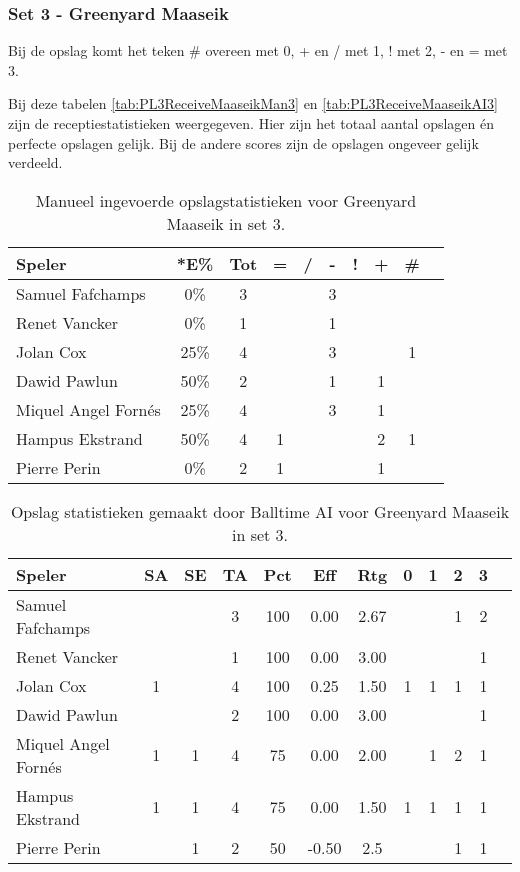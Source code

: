 \subsubsection{Set 3 - Greenyard Maaseik}
\label{sec:PL3_Greenyard3}
Bij de opslag komt het teken \# overeen met 0, + en / met 1, ! met 2, - en = met 3.

Bij deze tabelen \ref{tab:PL3ReceiveMaaseikMan3} en \ref{tab:PL3ReceiveMaaseikAI3} zijn de receptiestatistieken weergegeven. Hier zijn het totaal aantal opslagen én perfecte opslagen gelijk. Bij de andere scores zijn de opslagen ongeveer gelijk verdeeld.

\begin{table}[ht!]
    \centering
    \scriptsize
    \begin{tabular}{|l|c|c|c|c|c|c|c|c|c|} \hline
        \textbf{Speler} & *E\% & Tot & = & / & - & ! & + & \#\\ \hline
        Samuel Fafchamps & 0\% & 3 &  &  & 3 &  &  &  \\ 
        Renet Vancker & 0\% & 1 &  &  & 1 &  &  & \\ 
        Jolan Cox & 25\% & 4 &  &  & 3 &  &  & 1 \\ 
        Dawid Pawlun & 50\% & 2 &  &  & 1 &  & 1 &  \\ 
        Miquel Angel Fornés & 25\% & 4 &  &  & 3 &  & 1 &  \\ 
        Hampus Ekstrand & 50\% & 4 & 1 &  &  &  & 2 & 1 \\ 
        Pierre Perin & 0\% & 2 & 1 &  &  &  & 1 &  \\ \hline
    \end{tabular}
    \caption[Manueel ingevoerde opslagstatistieken voor Greenyard Maaseik in set 3]{\label{tab:PL3ServeMaaseikMan3}Manueel ingevoerde opslagstatistieken voor Greenyard Maaseik in set 3.}
\end{table}

\begin{table}[ht!]
  \centering
  \scriptsize
  \begin{tabular}{|l|c|c|c|c|c|c|c|c|c|c|c|} \hline
    \textbf{Speler} & SA & SE & TA & Pct & Eff & Rtg & 0 & 1 & 2 & 3 \\ \hline
    Samuel Fafchamps &  &  & 3 & 100 & 0.00 & 2.67 &   &  & 1 & 2  \\
    Renet Vancker &  &  & 1 & 100 & 0.00 & 3.00 &  &  &  & 1 \\
    Jolan Cox & 1 &  & 4 & 100 & 0.25 & 1.50 & 1 & 1 & 1 & 1 \\
    Dawid Pawlun &  &  & 2 & 100 & 0.00 & 3.00 &   &   & & 1 \\
    Miquel Angel Fornés & 1 & 1 & 4 & 75 & 0.00 & 2.00 &   & 1 & 2 & 1 \\
    Hampus Ekstrand & 1 & 1 & 4 & 75 & 0.00 & 1.50 & 1 & 1 & 1 & 1\\
    Pierre Perin & & 1 & 2 & 50 & -0.50 & 2.5 &   &  & 1 & 1 \\ \hline
  \end{tabular}
  \caption[Opslagstatistieken gemaakt door Balltime AI voor Greenyard Maaseik in set 3]{\label{tab:PL3ServeMaaseikAI3}Opslag statistieken gemaakt door Balltime AI voor Greenyard Maaseik in set 3.}
\end{table}

